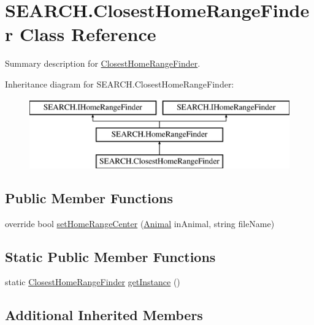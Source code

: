 \hypertarget{class_s_e_a_r_c_h_1_1_closest_home_range_finder}{\section{S\-E\-A\-R\-C\-H.\-Closest\-Home\-Range\-Finder Class Reference}
\label{class_s_e_a_r_c_h_1_1_closest_home_range_finder}
}


Summary description for \hyperlink{class_s_e_a_r_c_h_1_1_closest_home_range_finder}{Closest\-Home\-Range\-Finder}.  


Inheritance diagram for S\-E\-A\-R\-C\-H.\-Closest\-Home\-Range\-Finder\-:\begin{figure}[H]
\begin{center}
\leavevmode
\includegraphics[height=3.000000cm]{class_s_e_a_r_c_h_1_1_closest_home_range_finder}
\end{center}
\end{figure}
\subsection*{Public Member Functions}
\begin{DoxyCompactItemize}
\item 
override bool \hyperlink{class_s_e_a_r_c_h_1_1_closest_home_range_finder_a9f4b1aae4a27e1109c03ea444fdaf185}{set\-Home\-Range\-Center} (\hyperlink{class_s_e_a_r_c_h_1_1_animal}{Animal} in\-Animal, string file\-Name)
\end{DoxyCompactItemize}
\subsection*{Static Public Member Functions}
\begin{DoxyCompactItemize}
\item 
static \hyperlink{class_s_e_a_r_c_h_1_1_closest_home_range_finder}{Closest\-Home\-Range\-Finder} \hyperlink{class_s_e_a_r_c_h_1_1_closest_home_range_finder_a4c409e9d17edbf2855372390bdd1a4a1}{get\-Instance} ()
\end{DoxyCompactItemize}
\subsection*{Additional Inherited Members}


